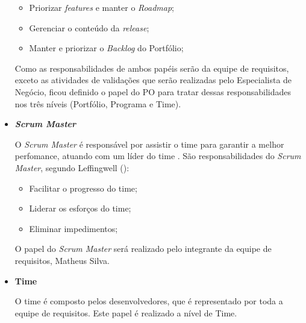 \begin{itemize}
\begin{itemize}
       \item Priorizar \textit{features} e manter o \textit{Roadmap};
       
       \item Gerenciar o conteúdo da \textit{release};
       
       \item Manter e priorizar o \textit{Backlog} do Portfólio;
       
      \end{itemize}
      
      Como as responsabilidades de ambos papéis serão da equipe de requisitos, exceto as atividades de validações que serão
      realizadas pelo Especialista de Negócio, ficou definido o papel do PO para tratar dessas responsabilidades nos três
      níveis (Portfólio, Programa e Time).
      
   \item \textbf{\textit{Scrum Master}}
      
      O \textit{Scrum Master} é responsável por assistir o time para garantir a melhor perfomance, atuando com 
      um líder do time \cite{leffingwell11}.
      São responsabilidades do \textit{Scrum Master}, segundo Leffingwell (\citeyear{leffingwell11}):
      
      \begin{itemize}
       
       \item Facilitar o progresso do time;
       
       \item Liderar os esforços do time;
       
       \item Eliminar impedimentos;
       
      \end{itemize}
      
      O papel do \textit{Scrum Master} será realizado pelo integrante da equipe de requisitos, Matheus Silva.
      
   \item \textbf{Time}
      
      O time é composto pelos desenvolvedores, que é representado por toda a equipe de requisitos. Este papel é realizado
      a nível de Time.
      
  \end{itemize}
  
  \vfill